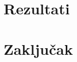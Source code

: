 \documentclass[times, utf8, seminar, numeric]{fer}
\begin{document}
\chapter{Rezultati}

\chapter{Zaključak}




\begin{sazetak}


\end{sazetak}
\end{document}
